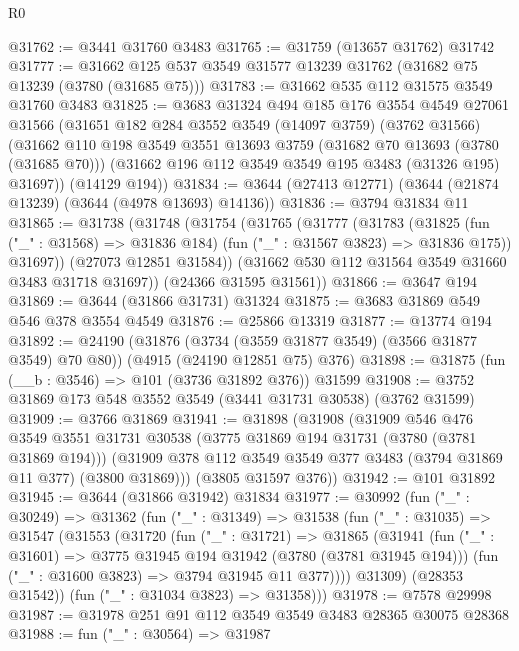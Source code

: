 \begin{lexlean}{R0}
\begin{coremodule}
@31762 := @3441 @31760 @3483
@31765 := @31759 (@13657 @31762) @31742
@31777 := @31662 @125 @537 @3549 @31577 @13239 @31762 (@31682 @75 @13239 (@3780 (@31685 @75)))
@31783 := @31662 @535 @112 @31575 @3549 @31760 @3483
@31825 := @3683
    @31324
    @494
    @185
    @176
    @3554
    @4549
    @27061
    @31566
    (@31651
      @182
      @284
      @3552
      @3549
      (@14097 @3759)
      (@3762 @31566)
      (@31662
        @110
        @198
        @3549
        @3551
        @13693
        @3759
        (@31682 @70 @13693 (@3780 (@31685 @70)))
        (@31662 @196 @112 @3549 @3549 @195 @3483 (@31326 @195) @31697))
      (@14129 @194))
@31834 := @3644 (@27413 @12771) (@3644 (@21874 @13239) (@3644 (@4978 @13693) @14136))
@31836 := @3794 @31834 @11
@31865 := @31738
    (@31748
      (@31754
        (@31765
          (@31777
            (@31783
              (@31825 (fun ("_" : @31568) => @31836 @184) (fun ("_" : @31567 @3823) => @31836 @175))
              @31697))
          (@27073 @12851 @31584))
        (@31662 @530 @112 @31564 @3549 @31660 @3483 @31718 @31697))
      (@24366 @31595 @31561))
@31866 := @3647 @194
@31869 := @3644 (@31866 @31731) @31324
@31875 := @3683 @31869 @549 @546 @378 @3554 @4549
@31876 := @25866 @13319
@31877 := @13774 @194
@31892 := @24190
    (@31876 (@3734 (@3559 @31877 @3549) (@3566 @31877 @3549) @70 @80))
    (@4915 (@24190 @12851 @75) @376)
@31898 := @31875 (fun (__b : @3546) => @101 (@3736 @31892 @376)) @31599
@31908 := @3752 @31869 @173 @548 @3552 @3549 (@3441 @31731 @30538) (@3762 @31599)
@31909 := @3766 @31869
@31941 := @31898
    (@31908
      (@31909
        @546
        @476
        @3549
        @3551
        @31731
        @30538
        (@3775 @31869 @194 @31731 (@3780 (@3781 @31869 @194)))
        (@31909 @378 @112 @3549 @3549 @377 @3483 (@3794 @31869 @11 @377) (@3800 @31869)))
      (@3805 @31597 @376))
@31942 := @101 @31892
@31945 := @3644 (@31866 @31942) @31834
@31977 := @30992
    (fun ("_" : @30249) =>
    @31362
      (fun ("_" : @31349) =>
      @31538
        (fun ("_" : @31035) =>
        @31547
          (@31553
            (@31720
              (fun ("_" : @31721) =>
              @31865
                (@31941
                  (fun ("_" : @31601) => @3775 @31945 @194 @31942 (@3780 (@3781 @31945 @194)))
                  (fun ("_" : @31600 @3823) => @3794 @31945 @11 @377))))
            @31309)
          (@28353 @31542))
        (fun ("_" : @31034 @3823) => @31358)))
@31978 := @7578 @29998
@31987 := @31978 @251 @91 @112 @3549 @3549 @3483 @28365 @30075 @28368
@31988 := fun ("_" : @30564) => @31987

\end{coremodule}
\end{lexlean}
